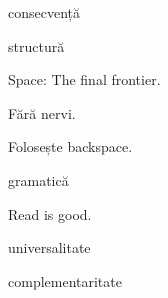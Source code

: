 \documentclass{beamer}
\begin{document}
\begin{frame}{}
  \LARGE
  \begin{center}
    consecvență
  \end{center}
\end{frame}

\begin{frame}{}
  \LARGE
  \begin{center}
    structură
  \end{center}
\end{frame}

\begin{frame}{}
  \LARGE
  \begin{center}
    Space: The final frontier.
  \end{center}
\end{frame}

\begin{frame}{}
  \LARGE
  \begin{center}
    Fără nervi.
  \end{center}
\end{frame}

\begin{frame}{}
  \LARGE
  \begin{center}
    Folosește backspace.
  \end{center}
\end{frame}

\begin{frame}{}
  \LARGE
  \begin{center}
    gramatică
  \end{center}
\end{frame}

\begin{frame}{}
  \LARGE
  \begin{center}
    Read is good.
  \end{center}
\end{frame}

\begin{frame}{}
  \LARGE
  \begin{center}
    universalitate
  \end{center}
\end{frame}

\begin{frame}{}
  \LARGE
  \begin{center}
    complementaritate
  \end{center}
\end{frame}
\end{document}
